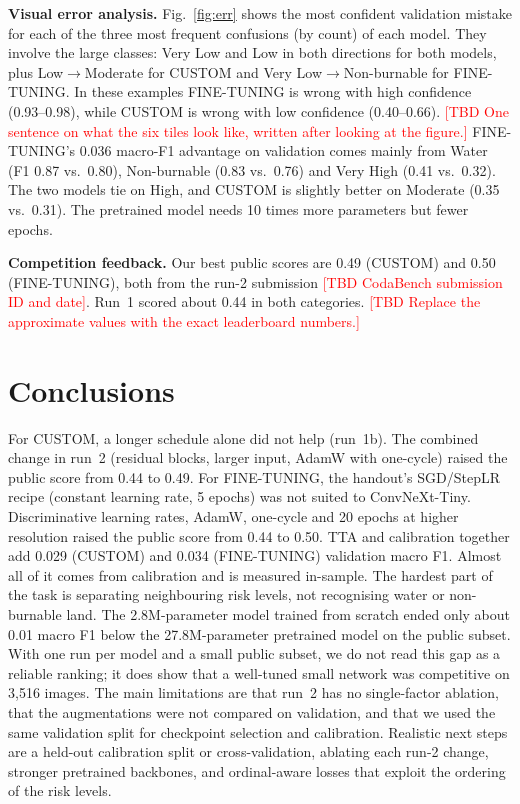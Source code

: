 \documentclass[10pt]{article}
\newcommand{\TBD}[1]{\textcolor{red}{[TBD #1]}}
\begin{document}
\textbf{Visual error analysis.} Fig.~\ref{fig:err} shows the most confident validation mistake for each of the three most frequent confusions (by count) of each model. They involve the large classes: Very Low and Low in both directions for both models, plus Low$\to$Moderate for CUSTOM and Very Low$\to$Non-burnable for FINE-TUNING. In these examples FINE-TUNING is wrong with high confidence (0.93--0.98), while CUSTOM is wrong with low confidence (0.40--0.66). \TBD{One sentence on what the six tiles look like, written after looking at the figure.} FINE-TUNING's 0.036 macro-F1 advantage on validation comes mainly from Water (F1 0.87 vs.\ 0.80), Non-burnable (0.83 vs.\ 0.76) and Very High (0.41 vs.\ 0.32). The two models tie on High, and CUSTOM is slightly better on Moderate (0.35 vs.\ 0.31). The pretrained model needs 10 times more parameters but fewer epochs.

\textbf{Competition feedback.} Our best public scores are 0.49 (CUSTOM) and 0.50 (FINE-TUNING), both from the run-2 submission \TBD{CodaBench submission ID and date}. Run~1 scored about 0.44 in both categories. \TBD{Replace the approximate values with the exact leaderboard numbers.}

\section{Conclusions}

For CUSTOM, a longer schedule alone did not help (run~1b). The combined change in run~2 (residual blocks, larger input, AdamW with one-cycle) raised the public score from 0.44 to 0.49. For FINE-TUNING, the handout's SGD/StepLR recipe (constant learning rate, 5 epochs) was not suited to ConvNeXt-Tiny. Discriminative learning rates, AdamW, one-cycle and 20 epochs at higher resolution raised the public score from 0.44 to 0.50. TTA and calibration together add 0.029 (CUSTOM) and 0.034 (FINE-TUNING) validation macro F1. Almost all of it comes from calibration and is measured in-sample. The hardest part of the task is separating neighbouring risk levels, not recognising water or non-burnable land. The 2.8M-parameter model trained from scratch ended only about 0.01 macro F1 below the 27.8M-parameter pretrained model on the public subset. With one run per model and a small public subset, we do not read this gap as a reliable ranking; it does show that a well-tuned small network was competitive on 3{,}516 images. The main limitations are that run~2 has no single-factor ablation, that the augmentations were not compared on validation, and that we used the same validation split for checkpoint selection and calibration. Realistic next steps are a held-out calibration split or cross-validation, ablating each run-2 change, stronger pretrained backbones, and ordinal-aware losses that exploit the ordering of the risk levels.
\end{document}
